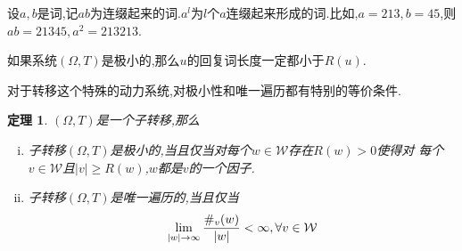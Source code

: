 \documentclass[a4paper,11pt,oneside]{book}
\newtheorem{theorem}{\textbf{\hspace{0.7cm}定理}}[section]
\begin{document}
设$a,b$是词,记$ab$为连缀起来的词.$a^l$为$l$个$a$连缀起来形成的词.比如,$a=213,b=45$,则$ab=21345,a^2=213213$.

如果系统$(\Omega,T)$是极小的,那么$u$的回复词长度一定都小于$R(u)$.

对于转移这个特殊的动力系统,对极小性和唯一遍历都有特别的等价条件.

\begin{theorem}
\label{t:subshift}
$(\Omega,T)$是一个子转移,那么
\begin{enumerate}[(i)]
\item 子转移$(\Omega,T)$是极小的,当且仅当对每个$w\in \mathcal{W}$存在$R(w)>0$使得对%
每个$v\in \mathcal{W}$且$|v|\geq R(w)$,$w$都是$v$的一个因子.
\item 子转移$(\Omega,T)$是唯一遍历的,当且仅当$$\lim_{|w| \to \infty}{\#_v(w)\over |w |}<\infty, \forall v\in \mathcal{W}$$
\end{enumerate}
\end{theorem}
\end{document}
